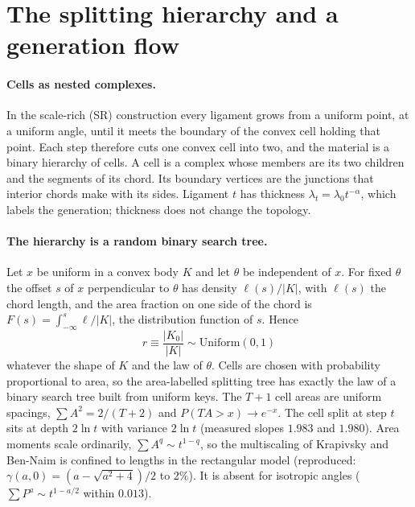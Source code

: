 \section{The splitting hierarchy and a generation flow}
\label{sec:rg}

\paragraph{Cells as nested complexes.}
In the scale-rich (SR) construction every ligament grows from a uniform point,
at a uniform angle, until it meets the boundary of the convex cell holding
that point. Each step therefore cuts one convex cell into two, and the material
is a binary hierarchy of cells. A cell is a complex whose members are its two
children and the segments of its chord. Its boundary vertices are the
junctions that interior chords make with its sides. Ligament $t$ has thickness
$\lambda_t=\lambda_0 t^{-\alpha}$, which labels the generation; thickness does
not change the topology.

\paragraph{The hierarchy is a random binary search tree.}
Let $x$ be uniform in a convex body $K$ and let $\theta$ be independent of
$x$. For fixed $\theta$ the offset $s$ of $x$ perpendicular to $\theta$ has
density $\ell(s)/|K|$, with $\ell(s)$ the chord length, and the area fraction
on one side of the chord is $F(s)=\int_{-\infty}^{s}\ell/|K|$, the distribution
function of $s$. Hence
\begin{equation}
  r \equiv \frac{|K_0|}{|K|} \sim \mathrm{Uniform}(0,1)
\end{equation}
whatever the shape of $K$ and the law of $\theta$. Cells are chosen with
probability proportional to area, so the area-labelled splitting tree has
exactly the law of a binary search tree built from uniform keys. The $T+1$
cell areas are uniform spacings, $\sum A^2 = 2/(T+2)$ and
$P(TA>x)\to e^{-x}$. The cell split at step $t$ sits at depth
$2\ln t$ with variance $2\ln t$ (measured slopes $1.983$ and $1.980$). Area
moments scale ordinarily, $\sum A^q\sim t^{1-q}$, so the multiscaling of
Krapivsky and Ben-Naim is confined to lengths in the rectangular model
(reproduced: $\gamma(a,0)=(a-\sqrt{a^2+4})/2$ to 2\%). It is absent for
isotropic angles ($\sum P^a\sim t^{1-a/2}$ within $0.013$).

